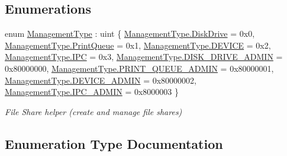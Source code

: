 \subsection*{Enumerations}
\begin{DoxyCompactItemize}
\item 
enum \hyperlink{namespace_open_1_1_g_i_1_1hypermart_1_1_helpers_a6b99f1e1d7a403abfd1f2ceb7fcb8e41}{Management\+Type} \+: uint \{ \newline
\hyperlink{namespace_open_1_1_g_i_1_1hypermart_1_1_helpers_a6b99f1e1d7a403abfd1f2ceb7fcb8e41adc8b3ede1c4a7d046b28690397e7bc54}{Management\+Type.\+Disk\+Drive} = 0x0, 
\hyperlink{namespace_open_1_1_g_i_1_1hypermart_1_1_helpers_a6b99f1e1d7a403abfd1f2ceb7fcb8e41ae71bdc4c38933eed3f4694f182f31fd8}{Management\+Type.\+Print\+Queue} = 0x1, 
\hyperlink{namespace_open_1_1_g_i_1_1hypermart_1_1_helpers_a6b99f1e1d7a403abfd1f2ceb7fcb8e41ae10b6ab6a278644ce40631f62f360b6d}{Management\+Type.\+D\+E\+V\+I\+CE} = 0x2, 
\hyperlink{namespace_open_1_1_g_i_1_1hypermart_1_1_helpers_a6b99f1e1d7a403abfd1f2ceb7fcb8e41ac8660c6d72e7323867ec800d6bb953df}{Management\+Type.\+I\+PC} = 0x3, 
\newline
\hyperlink{namespace_open_1_1_g_i_1_1hypermart_1_1_helpers_a6b99f1e1d7a403abfd1f2ceb7fcb8e41ad99f15606e6e8555c01b7ce7af881006}{Management\+Type.\+D\+I\+S\+K\+\_\+\+D\+R\+I\+V\+E\+\_\+\+A\+D\+M\+IN} = 0x80000000, 
\hyperlink{namespace_open_1_1_g_i_1_1hypermart_1_1_helpers_a6b99f1e1d7a403abfd1f2ceb7fcb8e41a155c7c24b15d822ca5c2185df2d3680b}{Management\+Type.\+P\+R\+I\+N\+T\+\_\+\+Q\+U\+E\+U\+E\+\_\+\+A\+D\+M\+IN} = 0x80000001, 
\hyperlink{namespace_open_1_1_g_i_1_1hypermart_1_1_helpers_a6b99f1e1d7a403abfd1f2ceb7fcb8e41ad35d20759ddf04ed0b0a3d64aaec699a}{Management\+Type.\+D\+E\+V\+I\+C\+E\+\_\+\+A\+D\+M\+IN} = 0x80000002, 
\hyperlink{namespace_open_1_1_g_i_1_1hypermart_1_1_helpers_a6b99f1e1d7a403abfd1f2ceb7fcb8e41a1805889a412e56185f803f04a8d79dcb}{Management\+Type.\+I\+P\+C\+\_\+\+A\+D\+M\+IN} = 0x8000003
 \}\begin{DoxyCompactList}\small\item\em File Share helper (create and manage file shares) \end{DoxyCompactList}
\end{DoxyCompactItemize}


\subsection{Enumeration Type Documentation}
\hypertarget{namespace_open_1_1_g_i_1_1hypermart_1_1_helpers_a6b99f1e1d7a403abfd1f2ceb7fcb8e41}{}\label{namespace_open_1_1_g_i_1_1hypermart_1_1_helpers_a6b99f1e1d7a403abfd1f2ceb7fcb8e41} 
